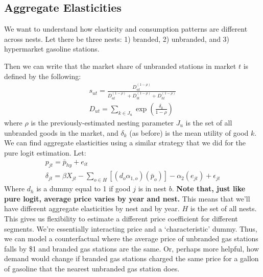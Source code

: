 \documentclass{article}
\begin{document}
\subsection{Aggregate Elasticities}

We want to understand how elasticity and consumption patterns are different across nests. Let there be three nests: 1) branded, 2) unbranded, and 3) hypermarket gasoline stations.

Then we can write that the market share of unbranded stations in market $t$ is defined by the following:
\begin{gather}
	s_{ut} = \frac{D_{ut}^{(1 - \rho)}}{D_{ut}^{(1 - \rho)} + D_{bt}^{(1 - \rho)} + D_{ht}^{(1-\rho)}} \\
	D_{ut} = \sum_{k \in J_u} \exp(\frac{\delta_k}{1 - \rho})
\end{gather}
where $\rho$ is the previously-estimated nesting parameter $J_u$ is the set of all unbranded goods in the market, and $\delta_k$ (as before) is the mean utility of good $k$. We can find aggregate elasticities using a similar strategy that we did for the pure logit estimation. Let:
\begin{gather}
	p_{jt} = \bar{p}_{hy} + e_{it} \\
	\delta_{jt} = \beta X_{jt} - \sum_{o \in H}[(d_o \alpha_{1, o}) (\bar{p}_o)] - \alpha_2 (e_{jt}) + \epsilon_{jt}
\end{gather}
Where $d_h$ is a dummy equal to 1 if good $j$ is in nest $b$. \textbf{Note that, just like pure logit, average price varies by year and nest.} This means that we'll have different aggregate elasticities by nest and by year. $H$ is the set of all nests. This gives us flexibility to estimate a different price coefficient for different segments. We're essentially interacting price and a `characteristic' dummy. Thus, we can model a counterfactual where the average price of unbranded gas stations falls by \$1 and branded gas stations are the same. Or, perhaps more helpful, how demand would change if branded gas stations charged the same price for a gallon of gasoline that the nearest unbranded gas station does.
\end{document}
